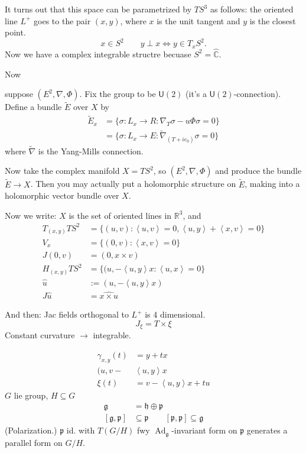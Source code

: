 It turns out that this space can be
parametrized by $TS^3$ as follows: the
oriented line $L^+$ goes to the pair $(x,y)$,
where $x$ is the unit tangent and $y$ is the
closest point.
$$
x \in S^2 \qquad y \perp x \iff y \in T_x
S^2.
$$
Now we have a complex integrable structre
becuase $S^2=\hat{\mathbb{C}}$.

Now

suppose $(E^2, \nabla, \Phi)$. Fix the group
to be $\mathsf{U}(2)$ (it's a
$\mathsf{U}(2)$-connection). Define a bundle
$\tilde{E}$ over $X$ by
$$
\begin{aligned}
\tilde{E}_x &= \{ \sigma: L_x \to R:
\nabla_T\sigma - u\Phi \sigma=0\} \\
&= \{\sigma:L_x \to E: \tilde{\nabla}_{(T+i
e_0)}\sigma=0\}
\end{aligned}
$$
where $\tilde{\nabla}$ is the Yang-Mills
connection.

Now take the complex manifold $X= TS^2$, so
$(E^2,\nabla,\Phi)$ and produce the bundle
$\tilde{ E} \to X$. Then you may actually put
a holomorphic structure on $\tilde{E}$,
making into a holomorphic vector bundle over
$X$.

Now we write: $X$ is the set of oriented
lines in $\mathbb{R}^3$, and
$$
\begin{aligned}
T_{(x,y)}TS^2 &= \{(u,v): \left\langle{} u,v
\right\rangle{}=0, \left\langle{} u,y
\right\rangle{}+\left\langle{} x,v
\right\rangle{}=0\} \\
V_x &= \{(0,v) : \left\langle{} x,v
\right\rangle{}=0\} \\
J(0,v) &= (0,x \times v) \\
H_{(x,y)}TS^2 &= \{(u,-\left\langle{} u,y
\right\rangle{}x:\left\langle{} u,x
\right\rangle{}=0\} \\
\hat{u} &:=(u,-\left\langle{} u,y
\right\rangle{}x) \\
J\hat{u} &= \widehat{x \times u}
\end{aligned}
$$

And then: Jac fields orthogonal to $L^+$ is 4
dimensional.
$$
J_{\xi}=T \times \xi
$$
Constant curvature $\to$ integrable.

$$
\begin{aligned}
\gamma_{x,y}(t) &= y+t x \\
(u,v- &\left\langle{} u,y \right\rangle{}x \\
\xi(t) &= v-\left\langle{} u,y
\right\rangle{}x+tu
\end{aligned}
$$
$G$ lie group, $H\subseteq G$
$$
\begin{aligned}
\mathfrak{g} &= \mathfrak{h} \oplus
\mathfrak{p} \\
[\mathfrak{g},\mathfrak{p}] &\subseteq
\mathfrak{p} \qquad
[\mathfrak{p},\mathfrak{p}] \subseteq
\mathfrak{g}
\end{aligned}
$$
(Polarization.) $\mathfrak{p}$ id. with
$T(G/H)$ fwy
$\operatorname{Ad}_\mathfrak{g}$-invariant
form on $\mathfrak{p}$ generates a parallel
form on $G/H$.

